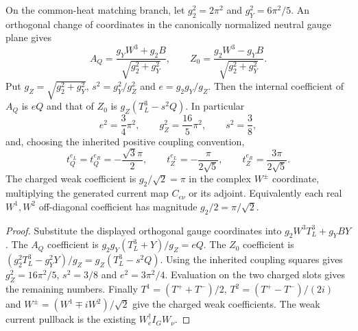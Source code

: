 \documentclass[12pt,a4paper]{article}
\begin{document}
\begin{proposition}
\label{p5c:prop:v2168-native-charged-vertices}
On the common-heat matching branch, let $g_2^2=2\pi^2$ and
$g_Y^2=6\pi^2/5$. An orthogonal change of coordinates in the canonically
normalized neutral gauge plane gives
\[
 A_Q=\frac{g_Y W^3+g_2 B}{\sqrt{g_2^2+g_Y^2}},\qquad
 Z_0=\frac{g_2 W^3-g_Y B}{\sqrt{g_2^2+g_Y^2}}.
\]
Put $g_Z=\sqrt{g_2^2+g_Y^2}$, $s^2=g_Y^2/g_Z^2$ and
$e=g_2g_Y/g_Z$. Then the internal coefficient of $A_Q$ is $eQ$ and that of
$Z_0$ is $g_Z(T_L^3-s^2Q)$. In particular
\[
 \boxed{
 e^2=\frac34\pi^2,\qquad g_Z^2=\frac{16}{5}\pi^2,\qquad s^2=\frac38,}
\]
and, choosing the inherited positive coupling convention,
\[
 \boxed{
 t_Q^{e_L}=t_Q^{e_R}=-\frac{\sqrt3\pi}{2},\qquad
 t_Z^{e_L}=-\frac{\pi}{2\sqrt5},\qquad
 t_Z^{e_R}=\frac{3\pi}{2\sqrt5}.}
\]
The charged weak coefficient is $g_2/\sqrt2=\pi$ in the complex $W^\pm$
coordinate, multiplying the generated current map $C_{e\nu}$ or its
adjoint. Equivalently each real $W^1,W^2$ off-diagonal coefficient has
magnitude $g_2/2=\pi/\sqrt2$.
\end{proposition}
\begin{proof}
Substitute the displayed orthogonal gauge coordinates into
$g_2W^3T_L^3+g_YBY$. The $A_Q$ coefficient is
$g_2g_Y(T_L^3+Y)/g_Z=eQ$. The $Z_0$ coefficient is
$(g_2^2T_L^3-g_Y^2Y)/g_Z=g_Z(T_L^3-s^2Q)$.
Using the inherited coupling squares gives $g_Z^2=16\pi^2/5$,
$s^2=3/8$ and $e^2=3\pi^2/4$. Evaluation on the two charged slots gives
the remaining numbers. Finally
$T^1=(T^++T^-)/2$, $T^2=(T^+-T^-)/(2i)$ and
$W^\pm=(W^1\mp iW^2)/\sqrt2$ give the charged weak coefficients.
The weak current pullback is the existing $W_e^\dagger I_GW_\nu$.
\end{proof}
\end{document}
